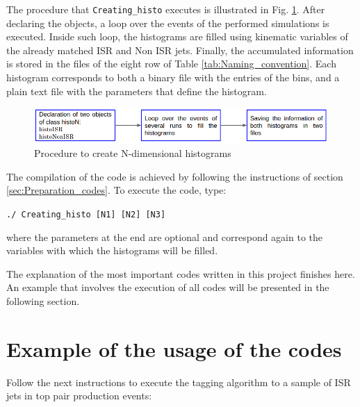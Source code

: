 \documentclass[12pt, oneside]{book}              %
\begin{document}
The procedure that \texttt{Creating\_histo} executes is illustrated in
Fig. \ref{fig:Creating_histo}. After declaring the objects, a loop over
the events of the performed simulations is executed. Inside such loop, 
the histograms are filled using kinematic variables of the already
matched ISR and Non ISR jets. Finally, the accumulated information is
stored in the files of the eight row of Table \ref{tab:Naming_convention}.
Each histogram corresponds to both a binary file with the entries of the
bins, and a plain text file with the parameters that define the histogram.

\begin{figure}[h]
\centering
\includegraphics[width=1.0\linewidth]{./Imags_Doc/Creating_histo}
\caption[Procedure to create histograms]{Procedure to create N-dimensional histograms}
\label{fig:Creating_histo}
\end{figure}

The compilation of the code is achieved by following the instructions
of section \ref{sec:Preparation_codes}. To execute the code, type:

\noindent \texttt{./ Creating\_histo [N1] [N2] [N3]}

where the parameters at the end are optional and correspond again to
the variables with which the histograms will be filled.

The explanation of the most important codes written in this
project finishes here. An example that involves the execution
of all codes will be presented in the following section.

\section{Example of the usage of the codes}\label{sec:Example_codes}

Follow the next instructions to execute the tagging algorithm 
to a sample of ISR jets in top pair production events:
\end{document}
